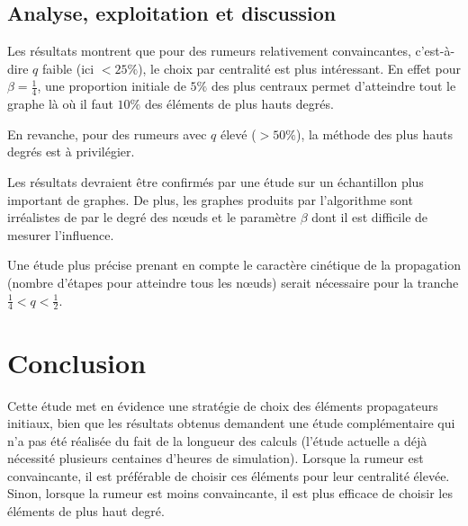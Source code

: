 \documentclass{article}
\begin{document}
\FloatBarrier
\subsection{Analyse, exploitation et discussion}
Les résultats montrent que pour des rumeurs relativement convaincantes, c'est-à-dire $q$ faible (ici $<25\%$), le choix par centralité est plus intéressant. En effet pour $\beta = \frac{1}{4}$, une proportion initiale de $5 \%$ des plus centraux permet d'atteindre tout le graphe là où il faut $10 \%$ des éléments de plus hauts degrés.

En revanche, pour des rumeurs avec $q$ élevé ($>50\%$), la méthode des plus hauts degrés est à privilégier. 

Les résultats devraient être confirmés par une étude sur un échantillon plus important de graphes. De plus, les graphes produits par l'algorithme sont irréalistes de par le degré des nœuds et le paramètre $\beta$ dont il est difficile de mesurer l'influence.

Une étude plus précise prenant en compte le caractère cinétique de la propagation (nombre d'étapes pour atteindre tous les nœuds) serait nécessaire pour la tranche $\frac{1}{4} < q < \frac{1}{2}$.

\section{Conclusion}
Cette étude met en évidence une stratégie de choix des éléments propagateurs initiaux, bien que les résultats obtenus demandent une étude complémentaire qui n'a pas été réalisée du fait de la longueur des calculs (l'étude actuelle a déjà nécessité plusieurs centaines d'heures de simulation). Lorsque la rumeur est convaincante, il est préférable de choisir ces éléments pour leur centralité élevée. Sinon, lorsque la rumeur est moins convaincante, il est plus efficace de choisir les éléments de plus haut degré.
\end{document}
